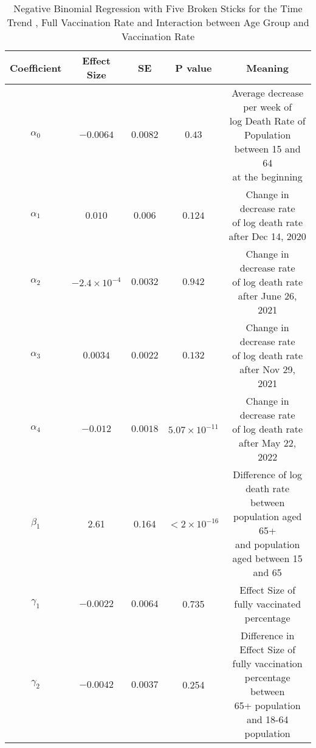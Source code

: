 \documentclass[12pt]{article}
\begin{document}
\begin{enumerate}[(a)]
	\begin{table}[htbp]
		\centering
		\begin{tabular}{ccccc}
			\toprule
			Coefficient & Effect Size & SE & P value & Meaning\\
			\midrule
			$\alpha_{0}$ & $-0.0064$ & $0.0082$ & $0.43$ & \makecell{Average decrease per week of \\ log Death Rate of  Population \\ between 15 and 64 \\ at the beginning}\\
			\addlinespace[0.2cm]
			$\alpha_{1}$ & $0.010$ & $0.006$ & $0.124$& \makecell{Change in decrease rate \\ of log death rate\\ after Dec 14, 2020}\\
			\addlinespace[0.2cm]
			$\alpha_{2}$ & $-2.4\times 10^{-4}$ & $0.0032$ & $0.942$& \makecell{Change in decrease rate \\ of log death rate\\ after June 26, 2021}\\
			\addlinespace[0.2cm]
			$\alpha_{3}$ & $0.0034$ & $0.0022$ & $0.132$& \makecell{Change in decrease rate \\ of log death rate\\ after Nov 29, 2021}\\
			\addlinespace[0.2cm]
			$\alpha_{4}$ & $-0.012$ & $0.0018$ & $5.07\times 10^{-11}$& \makecell{Change in decrease rate \\ of log death rate\\ after May 22, 2022}\\
			\addlinespace[0.2cm]
			$\beta_{1}$ & 2.61 & 0.164 & $<2\times 10^{-16}$ & \makecell{Difference of log death rate \\between population aged 65+ \\ and population aged between 15 and 65}\\
			\addlinespace[0.2cm]
			$\gamma_{1}$ & $-0.0022$ & $0.0064$ & 0.735 & \makecell{Effect Size of \\fully vaccinated percentage}\\
			\addlinespace[0.2cm]
			$\gamma_{2}$ & $-0.0042$ & $0.0037$ & 0.254 & \makecell{Difference in Effect Size of \\fully vaccination percentage between \\ 65+ population and 18-64 population}\\ 
			\bottomrule
		\end{tabular}
		\caption{Negative Binomial Regression with Five Broken Sticks for the Time Trend , Full Vaccination Rate and Interaction between Age Group and Vaccination Rate}\label{sticknbfullvcage}
	\end{table}	
\end{enumerate}
\end{document}
